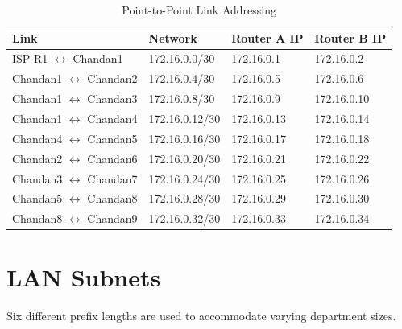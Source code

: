 \documentclass[12pt,a4paper]{report}
\begin{document}
\begin{table}[H]
\centering
\caption{Point-to-Point Link Addressing}
\label{tab:p2p}
\begin{tabular}{llll}
\toprule
\textbf{Link} & \textbf{Network} & \textbf{Router A IP} & \textbf{Router B IP} \\
\midrule
ISP-R1 $\leftrightarrow$ Chandan1 & 172.16.0.0/30 & 172.16.0.1 & 172.16.0.2 \\
Chandan1 $\leftrightarrow$ Chandan2 & 172.16.0.4/30 & 172.16.0.5 & 172.16.0.6 \\
Chandan1 $\leftrightarrow$ Chandan3 & 172.16.0.8/30 & 172.16.0.9 & 172.16.0.10 \\
Chandan1 $\leftrightarrow$ Chandan4 & 172.16.0.12/30 & 172.16.0.13 & 172.16.0.14 \\
Chandan4 $\leftrightarrow$ Chandan5 & 172.16.0.16/30 & 172.16.0.17 & 172.16.0.18 \\
Chandan2 $\leftrightarrow$ Chandan6 & 172.16.0.20/30 & 172.16.0.21 & 172.16.0.22 \\
Chandan3 $\leftrightarrow$ Chandan7 & 172.16.0.24/30 & 172.16.0.25 & 172.16.0.26 \\
Chandan5 $\leftrightarrow$ Chandan8 & 172.16.0.28/30 & 172.16.0.29 & 172.16.0.30 \\
Chandan8 $\leftrightarrow$ Chandan9 & 172.16.0.32/30 & 172.16.0.33 & 172.16.0.34 \\
\bottomrule
\end{tabular}
\end{table}

\section{LAN Subnets}
Six different prefix lengths are used to accommodate varying department sizes.
\end{document}
